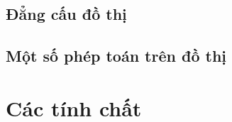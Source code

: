 \section{Đẳng cấu đồ thị}


\section{Một số phép toán trên đồ thị}
\label{sec:mot_so_phep_toan_tren_do_thi}


\chapter{Các tính chất}
\label{sec:mot_so_dinh_ly_menh_de}



\printbibliography[heading=bibintoc,title={Danh mục tài liệu tham khảo}]

